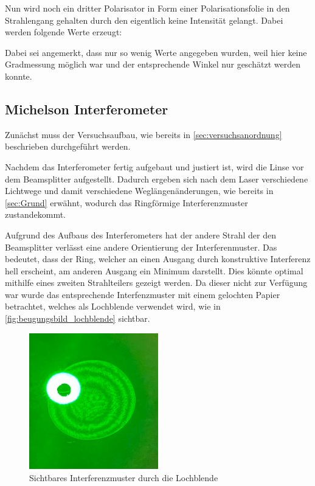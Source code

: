 \documentclass[12pt,english,ngerman]{scrartcl}
\begin{document}

Nun wird noch ein dritter Polarisator in Form einer Polarisationsfolie in den
Strahlengang gehalten durch den eigentlich keine Intensität gelangt. Dabei
werden folgende Werte erzeugt:


Dabei sei angemerkt, dass nur so wenig Werte angegeben wurden, weil hier keine
Gradmessung möglich war und der entsprechende Winkel nur geschätzt werden
konnte.

\subsection{Michelson Interferometer}

Zunächst muss der Versuchsaufbau, wie bereits in
\autoref{sec:versuchsanordnung} beschrieben durchgeführt werden.

Nachdem das Interferometer fertig aufgebaut und justiert ist, wird die Linse
vor dem Beamsplitter aufgestellt. Dadurch ergeben sich nach dem Laser
verschiedene Lichtwege und damit verschiedene Weglängenänderungen, wie bereits
in \autoref{sec:Grund} erwähnt, wodurch das Ringförmige Interferenzmuster
zustandekommt.

Aufgrund des Aufbaus des Interferometers hat der andere Strahl der den
Beamsplitter verlässt eine andere Orientierung der Interferenmuster. Das
bedeutet, dass der Ring, welcher an einen Ausgang durch konstruktive
Interferenz hell erscheint, am anderen Ausgang ein Minimum darstellt. Dies
könnte optimal mithilfe eines zweiten Strahlteilers gezeigt werden. Da dieser
nicht zur Verfügung war wurde das entsprechende Interfenzmuster mit einem
gelochten Papier betrachtet, welches als Lochblende verwendet wird, wie in
\autoref{fig:beugungsbild_lochblende} sichtbar.

\begin{figure}[H]
	\begin{center}
		\includegraphics[width =0.5\textwidth]{./figures/Blende.JPG}
	\end{center}
	\caption[Sichtbares Interferenzmuster durch die Lochblende] { Sichtbares
		Interferenzmuster durch die Lochblende
	}\label{fig:beugungsbild_lochblende}
\end{figure}
\end{document}
